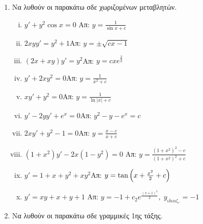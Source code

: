 



\pagestyle{askhseis}





\begin{center}
  \minibox{\large \bfseries \textcolor{Col1}{Συνήθεις Διαφορικές Εξισώσεις}}
\end{center}

\vspace{\baselineskip}

\begin{enumerate}

  \item Να λυθούν οι παρακάτω σδε χωριζομένων μεταβλητών.

    \begin{enumerate}[i)]
      \item $ y'+y^{2} \cos{x} = 0 $ \hfill Απ: $ y = \frac{1}{\sin{x} + c} $  %
      \item $2xyy'=y^2+1$\hfill Απ: $y= \pm \sqrt{cx-1}$  %
      \item $(2x+xy)y'=y^2$\hfill Απ: $y=cxe^{\frac{2}{y}}$
      \item $y'+2xy^2=0$\hfill Απ: $y=\frac{1}{x^2+c}$ %
      \item $xy'+y^2=0$\hfill Απ: $y=\frac{1}{\ln|x|+c}$ %
      \item $y'-2yy'+e^x=0$\hfill Απ: $y^2-y-e^x=c$ %
      \item $2xy'+y^2-1=0$\hfill Απ: $y=\frac{x-c}{x+c}$ %
      \item $(1+x^2)y'-2x(1-y^2)=0$
        \hfill Απ: $y= \frac{(1+x^{2})^{2}-c}{(1+x^{2})^{2}+c}$ %
      \item $y'=1+x+y^2+xy^2$\hfill Απ: $y=\tan{\Bigl(x+\frac{x^2}{2}+c\Bigr)}$ %
      \item $y'=xy+x+y+1$
        \hfill Απ: $y=-1+c_2e^{\frac{(x+1)^2}{2}}, \; y_{\text{ιδιαζ.}}=-1$
    \end{enumerate}

  \item Να λυθούν οι παρακάτω σδε γραμμικές 1ης τάξης.


\end{enumerate}
